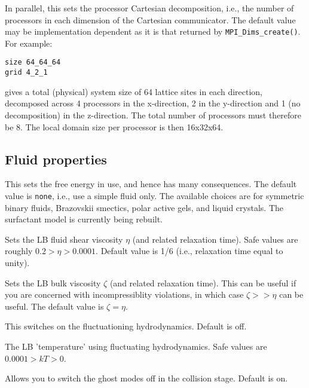 
In parallel, this sets the processor Cartesian decomposition, i.e.,
the number of processors in each dimension of the Cartesian communicator.
The default value may be implementation dependent as it is that returned
by \texttt{MPI\_Dims\_create()}. For
example:
\begin{verbatim}
size 64_64_64
grid 4_2_1
\end{verbatim}
gives a total (physical) system size of 64 lattice sites in each
direction, decomposed across 4 processors in the x-direction, 2 in
the y-direction and 1 (no decomposition) in the z-direction. The
total number of processors must therefore be 8. The local domain
size per processor is then 16x32x64.


\subsection{Fluid properties}


This sets the free energy in use, and hence has many consequences.
The default value is \texttt{none}, i.e., use a simple fluid only.
The available choices are for symmetric binary fluids, Brazovskii
smectics, polar active gels, and liquid crystals. The surfactant
model is currently being rebuilt.


Sets the LB fluid shear viscosity $\eta$ (and related relaxation time).
Safe values are roughly $0.2 > \eta > 0.0001 $. Default value is 1/6
(i.e., relaxation time equal to unity).


Sets the LB bulk viscosity $\zeta$ (and related relaxation time).
This can be useful if you are concerned with incompressiblity
violations, in which case $\zeta >> \eta$ can be useful. The
default value is $\zeta = \eta$.


This switches on the fluctuationing hydrodynamics. Default is off.


The LB 'temperature' using fluctuating hydrodynamics. Safe values
are $0.0001 > kT > 0$. 


Allows you to switch the ghost modes off in the collision stage.
Default is on.


